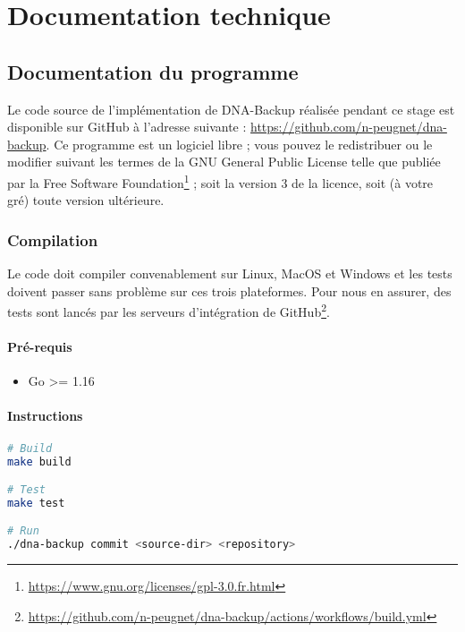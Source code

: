 \documentclass[a4paper]{report}
\begin{document}


\appendix



\chapter{Documentation technique}

\section{Documentation du programme}
\label{sec:documentation}

Le code source de l'implémentation de DNA-Backup réalisée pendant ce stage
est disponible sur GitHub à l'adresse suivante :
\url{https://github.com/n-peugnet/dna-backup}.
Ce programme est un logiciel libre ;
vous pouvez le redistribuer ou le modifier suivant les termes de la GNU General Public License
telle que publiée par la Free Software Foundation\footnote{\url{https://www.gnu.org/licenses/gpl-3.0.fr.html}} ;
soit la version 3 de la licence, soit (à votre gré) toute version ultérieure.

\subsection{Compilation}

Le code doit compiler convenablement sur Linux, MacOS et Windows
et les tests doivent passer sans problème sur ces trois plateformes.
Pour nous en assurer, des tests sont lancés par les serveurs
d'intégration de GitHub\footnote{\url{https://github.com/n-peugnet/dna-backup/actions/workflows/build.yml}}.

\subsubsection{Pré-requis}

\begin{itemize}
  \item Go >= 1.16
\end{itemize}

\subsubsection{Instructions}

\begin{lstlisting}[language=sh]
# Build
make build

# Test
make test

# Run
./dna-backup commit <source-dir> <repository>
\end{lstlisting}
\end{document}
